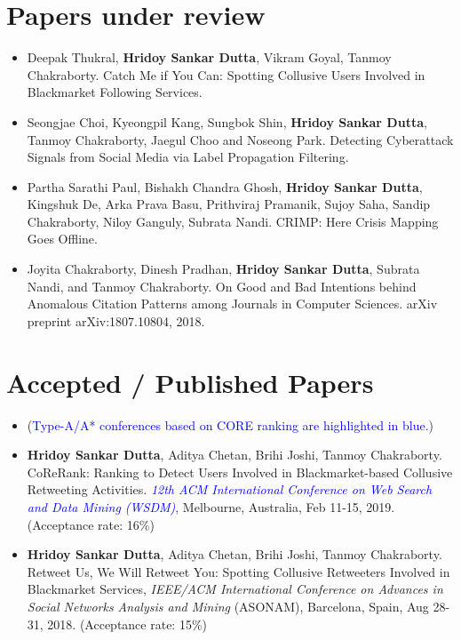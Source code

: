 \documentclass[margin, centered]{res}
\begin{document}
\begin{resume}
\section{Papers under review}
\begin{itemize}[leftmargin=*]
\item Deepak Thukral, \textbf{Hridoy Sankar Dutta}, Vikram Goyal, Tanmoy Chakraborty. Catch Me if You Can: Spotting Collusive Users Involved in Blackmarket Following Services.

\item Seongjae Choi, Kyeongpil Kang, Sungbok Shin, \textbf{Hridoy Sankar Dutta}, Tanmoy Chakraborty, Jaegul Choo and Noseong Park. Detecting Cyberattack Signals from Social Media via Label Propagation Filtering.

\item Partha Sarathi Paul, Bishakh Chandra Ghosh, \textbf{Hridoy Sankar Dutta}, Kingshuk De, Arka Prava Basu, Prithviraj Pramanik, Sujoy Saha, Sandip Chakraborty, Niloy Ganguly, Subrata Nandi. CRIMP: Here Crisis Mapping Goes Offline.

\item Joyita Chakraborty, Dinesh Pradhan, \textbf{Hridoy Sankar Dutta}, Subrata Nandi, and Tanmoy Chakraborty. On Good and Bad Intentions behind Anomalous Citation Patterns among Journals in Computer Sciences. arXiv preprint arXiv:1807.10804, 2018.
\end{itemize}

\section{Accepted / Published Papers}
\begin{itemize}[leftmargin=*]
\item[] (\textcolor{blue}{Type-A/A* conferences based on CORE ranking are highlighted in blue.})

\item \textbf{Hridoy Sankar Dutta}, Aditya Chetan, Brihi Joshi, Tanmoy Chakraborty. CoReRank: Ranking to Detect Users Involved in Blackmarket-based Collusive Retweeting Activities. \textit{\textcolor{blue}{12th ACM International Conference on Web Search and Data Mining (WSDM)}}, Melbourne, Australia, Feb 11-15, 2019. (Acceptance rate: 16\%)


\item \textbf{Hridoy Sankar Dutta}, Aditya Chetan, Brihi Joshi, Tanmoy Chakraborty. Retweet Us, We Will Retweet You: Spotting Collusive Retweeters Involved in Blackmarket Services, \textit{IEEE/ACM International Conference on Advances in Social Networks Analysis and Mining} (ASONAM), Barcelona, Spain, Aug 28-31, 2018. (Acceptance rate: 15\%)


\end{itemize}
\end{resume}
\end{document}
